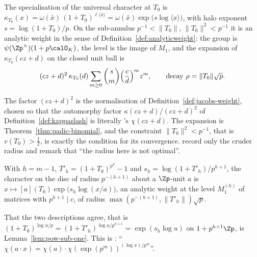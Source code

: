 \begin{definition}
  \label{def:haloweight}
  \leanok
  The specialisation of the universal character at $T_0$ is
  $\kappa_{T_0}(x) = \omega(\bar x)\,(1+T_0)^{\ell\langle x\rangle}
  = \omega(\bar x)\exp\bigl(s\log\langle x\rangle\bigr)$, with halo exponent
  $s = \log(1+T_0)/p$.  On the sub-annulus $p^{-1}<\lVert T_0\rVert$, $\lVert T_0\rVert^{2}<p^{-1}$
  it is an analytic weight in the sense of Definition~\ref{def:analyticweight}: the group is
  $\psi(\Zp^{\times})(1+p\calO_K)$, the level is the image of $M_1$, and the expansion of
  $\kappa_{T_0}(cz+d)$ on the closed unit ball is
  \[
    (cz+d)^{2}\,\kappa_{T_0}(d)\sum_{m\geq 0}\binom{s}{m}\Bigl(\frac{c}{d}\Bigr)^{m}z^{m},
    \qquad \text{decay } \rho = \lVert T_0\rVert\sqrt{p} .
  \]
\end{definition}

The factor $(cz+d)^{2}$ is the normalisation of Definition~\ref{def:jacobs-weight}, chosen so
that the automorphy factor $\kappa(cz+d)/(cz+d)^{2}$ of Definition~\ref{def:kappaslash} is
literally \cite[(2.3.2)]{LWX}'s $\chi(cz+d)$.  The expansion is
Theorem~\ref{thm:padic-binomial}, and the constraint $\lVert T_0\rVert^{2}<p^{-1}$, that is
$v(T_0)>\tfrac12$, is exactly the condition for its convergence.  \cite[\S2.7]{LWX} record only
the cruder radius and remark that ``the radius here is not optimal''.

\begin{definition}
  \label{def:haloweighth}
  \leanok
  With $h = m-1$, $T'_h = (1+T_0)^{p^{h}}-1$ and $s_h = \log(1+T'_h)/p^{h+1}$, the character on
  the disc of radius $p^{-(h+1)}$ about a $\Zp$-unit $a$ is
  $x\mapsto [a](T_0)\exp\bigl(s_h\log(x/a)\bigr)$, an analytic weight at the level
  $M_1^{(h)}$ of matrices with $p^{h+1}\mid c$, of radius
  $\max(p^{-(h+1)}, \lVert T'_h\rVert)\sqrt p$.
\end{definition}

That the two descriptions agree, that is
$(1+T_0)^{\log u/p} = (1+T'_h)^{\log u/p^{h+1}} = \exp(s_h\log u)$ on $1+p^{h+1}\Zp$, is
Lemma~\ref{lem:pow-sub-one}.  This is \cite[\S2.1]{LWX}: ``$\chi(a\cdot x) =
\chi(a)\cdot\chi(\exp(p^{m}))^{(\log x)/p^{m}}$''.


